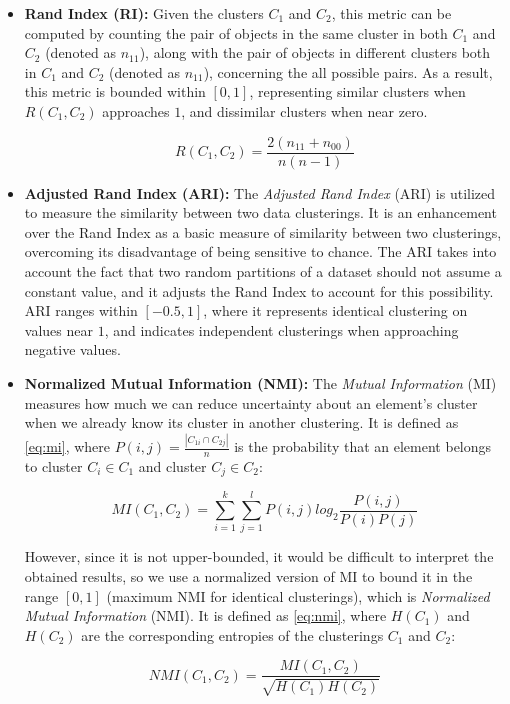 \begin{itemize}[]
    \item \textbf{Rand Index (RI):} Given the clusters $C_1$ and $C_2$, this metric can be computed by counting the pair of objects in the same cluster in both $C_1$ and $C_2$ (denoted as $n_{11}$), along with the pair of objects in different clusters both in $C_1$ and $C_2$ (denoted as $n_{11}$), concerning the all possible pairs. As a result, this metric is bounded within $[0, 1]$, representing similar clusters when $R(C_1, C_2)$ approaches $1$, and dissimilar clusters when near zero.

    \begin{equation}
        R(C_1, C_2) = \frac{2(n_{11} + n_{00})}{n(n-1)}
    \end{equation}

    \item \textbf{Adjusted Rand Index (ARI):} The \textit{Adjusted Rand Index} (ARI) is utilized to measure the similarity between two data clusterings. It is an enhancement over the Rand Index as a basic measure of similarity between two clusterings, overcoming its disadvantage of being sensitive to chance. The ARI takes into account the fact that two random partitions of a dataset should not assume a constant value, and it adjusts the Rand Index to account for this possibility. ARI ranges within $[-0.5, 1]$, where it represents identical clustering on values near $1$, and indicates independent clusterings when approaching negative values.

    \item \textbf{Normalized Mutual Information (NMI):} The \textit{Mutual Information} (MI) measures how much we can reduce uncertainty about an element's cluster when we already know its cluster in another clustering. It is defined as \eqref{eq:mi}, where $P(i,j)= \frac{|C_{1i} \cap C_{2j}|}{n}$ is the probability that an element belongs to cluster $C_i \in C_1$ and cluster $C_j \in C_2$:

    \begin{equation}
        MI(C_1, C_2) = \sum_{i=1}^{k} \sum_{j=1}^{l} P(i,j) log_{2} \frac{P(i,j)}{P(i)P(j)}
        \label{eq:mi}
    \end{equation}

    However, since it is not upper-bounded, it would be difficult to interpret the obtained results, so we use a normalized version of MI to bound it in the range $[0, 1]$ (maximum NMI for identical clusterings), which is \textit{Normalized Mutual Information} (NMI). It is defined as \eqref{eq:nmi}, where $H(C_1)$ and $H(C_2)$ are the corresponding entropies of the clusterings $C_1$ and $C_2$:

    \begin{equation}
        NMI(C_1, C_2) = \frac{MI(C_1, C_2)}{\sqrt{H(C_1) H(C_2)}}
        \label{eq:nmi}
    \end{equation}
    
\end{itemize}
